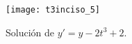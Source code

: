 \begin{figure}[!hbt]
\centering
  \texttt{[image: t3inciso\_5]}
	\caption{Solución de $y'=y-2t^3+2$.}%
	\label{fig:i5}
\end{figure}
